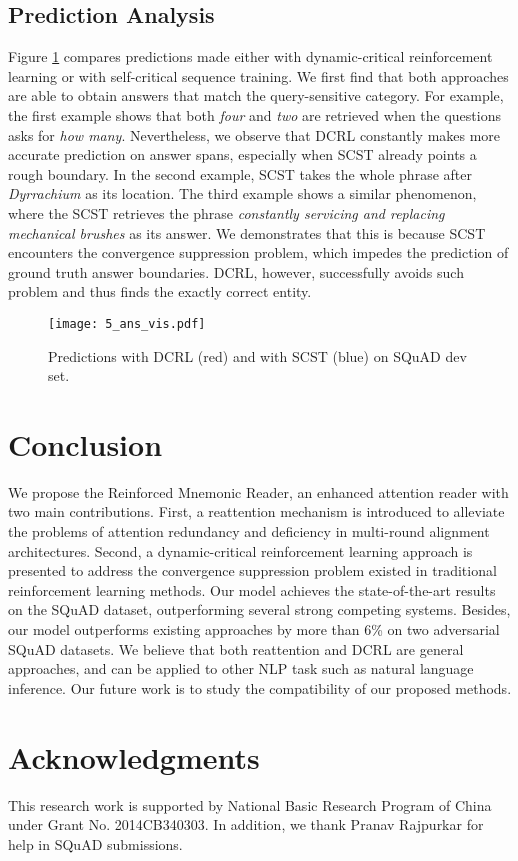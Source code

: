 \documentclass{article}
\begin{document}
\subsection{Prediction Analysis}
Figure \ref{fig3} compares predictions made either with dynamic-critical reinforcement learning or with self-critical sequence training. 
We first find that both approaches are able to obtain answers that match the query-sensitive category. For example, the first example shows that both \emph{four} and \emph{two} are retrieved when the questions asks for \emph{how many}. 
Nevertheless, we observe that DCRL constantly makes more accurate prediction on answer spans, especially when SCST already points a rough boundary. 
In the second example, SCST takes the whole phrase after \emph{Dyrrachium} as its location. The third example shows a similar phenomenon, where the SCST retrieves the phrase \emph{constantly servicing and
replacing mechanical brushes} as its answer.
We demonstrates that this is because SCST encounters the convergence suppression problem, which impedes the prediction of ground truth answer boundaries.
DCRL, however, successfully avoids such problem and thus finds the exactly correct entity.

\begin{figure}
\begin{center}
\texttt{[image: 5\_ans\_vis.pdf]}
\end{center}
\caption{Predictions with DCRL (red) and with SCST (blue) on SQuAD dev set.}
\label{fig3}
\end{figure}
 \section{Conclusion}
We propose the Reinforced Mnemonic Reader, an enhanced attention reader with two main contributions.
First, a reattention mechanism is introduced to alleviate the problems of attention redundancy and deficiency in multi-round alignment architectures.
Second, a dynamic-critical reinforcement learning approach is presented to address the convergence suppression problem existed in traditional reinforcement learning methods.
Our model achieves the state-of-the-art results on the SQuAD dataset, outperforming several strong competing systems. 
Besides, our model outperforms existing approaches by more than 6\% on two adversarial SQuAD datasets.
We believe that both reattention and DCRL are general approaches, and can be applied to other NLP task such as natural language inference. 
Our future work is to study the compatibility of our proposed methods.

\section*{Acknowledgments}
This research work is supported by National Basic Research Program of China under Grant No. 2014CB340303. 
In addition, we thank Pranav Rajpurkar for help in SQuAD submissions. 


\end{document}
